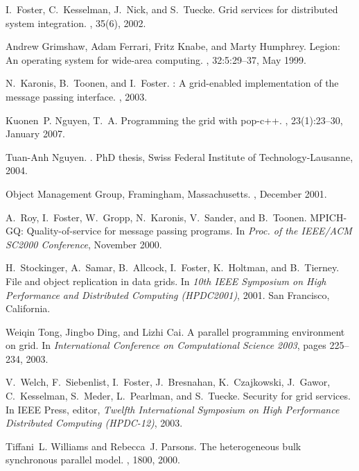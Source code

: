 \documentclass[a4paper, 11pt]{article}
\begin{document}
\begin{thebibliography}{9}
I.~Foster, C.~Kesselman, J.~Nick, and S.~Tuecke.
\newblock Grid services for distributed system integration.
, 35(6), 2002.

Andrew Grimshaw, Adam Ferrari, Fritz Knabe, and Marty Humphrey.
\newblock Legion: An operating system for wide-area computing.
, 32:5:29--37, May 1999.

N.~Karonis, B.~Toonen, and I.~Foster.
: A grid-enabled implementation of the message passing
  interface.
, 2003.

Kuonen~P. Nguyen, T.~A.
\newblock Programming the grid with pop-c++.
, 23(1):23--30,
  January 2007.

Tuan-Anh Nguyen.
.
\newblock PhD thesis, Swiss Federal Institute of Technology-Lausanne, 2004.

{Object Management Group}, Framingham, Massachusetts.
, December 2001.

A.~Roy, I.~Foster, W.~Gropp, N.~Karonis, V.~Sander, and B.~Toonen.
\newblock \mbox{MPICH-GQ}: Quality-of-service for message passing programs.
\newblock In {\em Proc. of the IEEE/ACM SC2000 Conference}, November 2000.

H.~Stockinger, A.~Samar, B.~Allcock, I.~Foster, K.~Holtman, and B.~Tierney.
\newblock File and object replication in data grids.
\newblock In {\em 10th IEEE Symposium on High Performance and Distributed
  Computing (HPDC2001)}, 2001.
\newblock San Francisco, California.

Weiqin Tong, Jingbo Ding, and Lizhi Cai.
\newblock A parallel programming environment on grid.
\newblock In {\em International Conference on Computational Science 2003},
  pages 225--234, 2003.

V.~Welch, F.~Siebenlist, I.~Foster, J.~Bresnahan, K.~Czajkowski, J.~Gawor,
  C.~Kesselman, S.~Meder, L.~Pearlman, and S.~Tuecke.
\newblock Security for grid services.
\newblock In IEEE Press, editor, {\em Twelfth International Symposium on High
  Performance Distributed Computing (HPDC-12)}, 2003.

Tiffani~L. Williams and Rebecca~J. Parsons.
\newblock The heterogeneous bulk synchronous parallel model.
, 1800, 2000.

\end{thebibliography}

\pagebreak
\appendix

\end{document}
